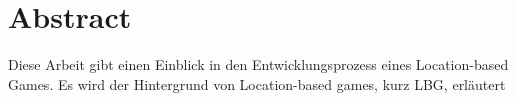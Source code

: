 \chapter{Abstract} 
Diese Arbeit gibt einen Einblick in den Entwicklungsprozess eines Location-based Games. Es wird der Hintergrund von Location-based games, kurz LBG, erläutert 